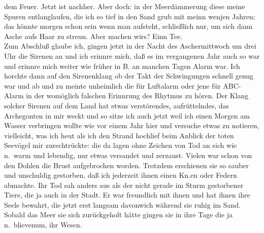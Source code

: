 \documentclass[
]{article}
\begin{document}
dem Feuer. Jetzt ist nachher. Aber doch: in der Meerdämmerung diese
meine Spuren entlanglaufen, die ich so tief in den Sand grub mit meinn
wenjen Jahren; das könnte morgen schon sein wenn man aufsteht,
schließlich nur, um sich dann Asche aufs Haar zu streun. Aber machen
wirs? Einn Tee.\\
Zum Abschluß glaube ich, gingen jetzt in der Nacht des Aschermittwoch um
drei Uhr die Sirenen an und ich erinnre mich, daß es im vergangenen Jahr
auch so war und erinnre mich weiter wie früher in B. an manchen Tagen
Alarm war. Ich horchte dann auf den Sirenenklang ob der Takt der
Schwingungen schnell genug war und ab und zu meinte unheimlich die für
Luftalarm oder jene für ABC-Alarm in der womöglich falschen Erinnrung
des Rhytmus zu hören. Der Klang solcher Sirenen auf dem Land hat etwas
verstörendes, aufrüttelndes, das Archegonten in mir weckt und so sitze
ich auch jetzt weil ich einen Morgen am Wasser verbringen wollte wie vor
einem Jahr hier und versuche etwas zu notieren, vielleicht, was ich heut
als ich den Strand hochlief beim Anblick der toten Seevögel mir
zurechtrückte: die da lagen ohne Zeichen von Tod an sich wie n.~warm und
lebendig, nur etwas versandet und zerzaust. Vielen war schon von den
Dohlen die Brust aufgebrochen worden. Trotzdem erschienen sie so sauber
und unschuldig gestorben, daß ich jederzeit ihnen einen Kn.en oder
Federn abmachte. Ihr Tod sah anders aus als der nicht gerade im Sturm
gestorbener Tiere, die ja auch in der Stadt. Er war freundlich mit ihnen
und hat ihnen ihre Seele bewahrt, die jetzt erst langsam davonwich
während sie ruhig im Sand. Sobald das Meer sie sich zurückgeholt hätte
gingen sie in ihre Tage die ja n.~blievenum, ihr Wesen.
\end{document}
